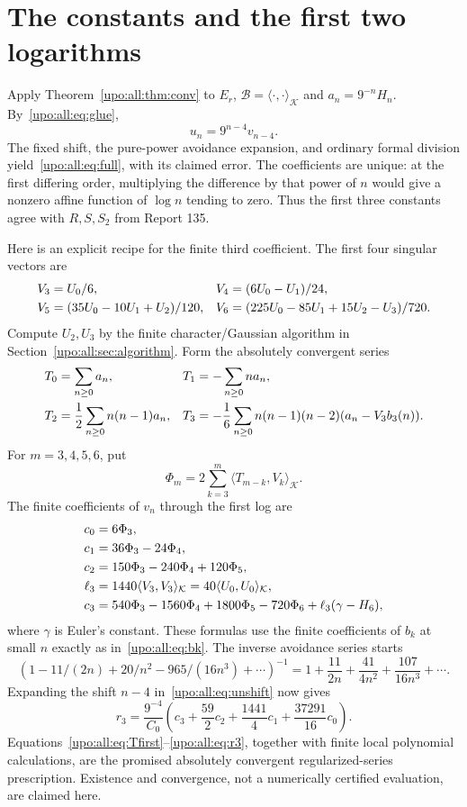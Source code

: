 \documentclass[11pt,letterpaper]{article}
\theoremstyle{remark}\newtheorem{remark}[theorem]{Remark}
\numberwithin{equation}{section}
\newcommand{\B}{\mathcal B}
\newcommand{\pa}[2]{\langle #1,#2\rangle_{\mathcal K}}
\begin{document}
\section{The constants and the first two logarithms}\label{upo:all:sec:third}
Apply Theorem~\ref{upo:all:thm:conv} to $E_r$, $\B=\langle\cdot,\cdot\rangle_{
\mathcal K}$ and $a_n=9^{-n}H_n$. By~\eqref{upo:all:eq:glue},
\begin{equation}\label{upo:all:eq:unshift}
u_n=9^{n-4}v_{n-4}.
\end{equation}
The fixed shift, the pure-power avoidance expansion, and ordinary
formal division yield~\eqref{upo:all:eq:full}, with its claimed error.
The coefficients are unique: at the first differing order, multiplying
the difference by that power of $n$ would give a nonzero affine
function of $\log n$ tending to zero. Thus the first three constants
agree with $R,S,S_2$ from Report 135.

Here is an explicit recipe for the finite third coefficient. The first
four singular vectors are
\begin{align}
V_3&=U_0/6,&V_4&=(6U_0-U_1)/24,\notag\\
V_5&=(35U_0-10U_1+U_2)/120,&
V_6&=(225U_0-85U_1+15U_2-U_3)/720.\label{upo:all:eq:Vfirst}
\end{align}
Compute $U_2,U_3$ by the finite character/Gaussian algorithm in
Section~\ref{upo:all:sec:algorithm}. Form the absolutely convergent series
\begin{align}
T_0&=\sum_{n\ge0}a_n,&T_1&=-\sum_{n\ge0}na_n,\notag\\
T_2&=\frac12\sum_{n\ge0}n(n-1)a_n,&
T_3&=-\frac16\sum_{n\ge0}n(n-1)(n-2)(a_n-V_3b_3(n)).
\label{upo:all:eq:Tfirst}
\end{align}
For $m=3,4,5,6$, put
\[
\Phi_m=2\sum_{k=3}^{m}\pa{T_{m-k}}{V_k}.
\]
The finite coefficients of $v_n$ through the first log are
\begin{align}
c_0&=6\Phi_3,\notag\\
c_1&=36\Phi_3-24\Phi_4,\notag\\
c_2&=150\Phi_3-240\Phi_4+120\Phi_5,\notag\\
\ell_3&=1440\pa{V_3}{V_3}=40\pa{U_0}{U_0},\notag\\
c_3&=540\Phi_3-1560\Phi_4+1800\Phi_5-720\Phi_6
 +\ell_3(\gamma-H_6),\label{upo:all:eq:cfirst}
\end{align}
where $\gamma$ is Euler's constant. These formulas use the finite
coefficients of $b_k$ at small $n$ exactly as in~\eqref{upo:all:eq:bk}.
The inverse avoidance series starts
\[
(1-11/(2n)+20/n^2-965/(16n^3)+\cdots)^{-1}
 =1+\frac{11}{2n}+\frac{41}{4n^2}+\frac{107}{16n^3}+\cdots.
\]
Expanding the shift $n-4$ in~\eqref{upo:all:eq:unshift} now gives
\begin{equation}\label{upo:all:eq:r3}
r_3=\frac{9^{-4}}{C_0}
 \left(c_3+\frac{59}{2}c_2+\frac{1441}{4}c_1
 +\frac{37291}{16}c_0\right).
\end{equation}
Equations~\eqref{upo:all:eq:Tfirst}--\eqref{upo:all:eq:r3}, together with finite local
polynomial calculations, are the promised absolutely convergent
regularized-series prescription. Existence and convergence, not a
numerically certified evaluation, are claimed here.
\end{document}

